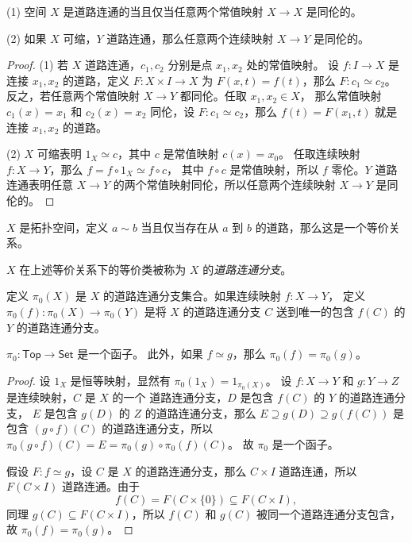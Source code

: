 \documentclass[fontset=none]{Notes}
\newcommand{\cat}[1]{\mathsf{#1}}
\begin{document}
\begin{problem}{}{}
  (1) 空间 $X$ 是道路连通的当且仅当任意两个常值映射
    $X\to X$ 是同伦的。

  (2) 如果 $X$ 可缩，$Y$ 道路连通，那么任意两个连续映射 $X\to Y$
  是同伦的。
\end{problem}
\begin{proof}
  (1) 若 $X$ 道路连通，$c_1,c_2$ 分别是点 $x_1,x_2$ 处的常值映射。
  设 $f:I\to X$ 是连接 $x_1,x_2$ 的道路，定义 $F:X\times I\to X$
  为 $F(x,t)=f(t)$，那么 $F:c_1\simeq c_2$。
  反之，若任意两个常值映射 $X\to Y$ 都同伦。任取 $x_1,x_2\in X$，
  那么常值映射 $c_1(x)=x_1$ 和 $c_2(x)=x_2$ 同伦，设 
  $F:c_1\simeq c_2$，那么 $f(t)=F(x_1,t)$ 就是连接 $x_1,x_2$ 的道路。

  (2) $X$ 可缩表明 $1_X\simeq c$，其中 $c$ 是常值映射 $c(x)=x_0$。
  任取连续映射 $f:X\to Y$，那么 $f=f\circ 1_X\simeq f\circ c$，
  其中 $f\circ c$ 是常值映射，所以 $f$ 零伦。$Y$ 道路连通表明任意
  $X\to Y$ 的两个常值映射同伦，所以任意两个连续映射 $X\to Y$
  是同伦的。
\end{proof}

\begin{theorem}
  $X$ 是拓扑空间，定义 $a\sim b$ 当且仅当存在从 $a$ 到 $b$
  的道路，那么这是一个等价关系。
\end{theorem}

\begin{definition}
  $X$ 在上述等价关系下的等价类被称为 $X$ 的\emph{道路连通分支}。 
\end{definition}

\begin{definition}
  定义 $\pi_0(X)$ 是 $X$ 的道路连通分支集合。如果连续映射 $f:X\to Y$，
  定义 $\pi_0(f):\pi_0(X)\to\pi_0(Y)$ 是将 $X$ 的道路连通分支 $C$
  送到唯一的包含 $f(C)$ 的 $Y$ 的道路连通分支。
\end{definition}

\begin{theorem}
  $\pi_0:\cat{Top}\to \cat{Set}$ 是一个函子。
  此外，如果 $f\simeq g$，那么 $\pi_0(f)=\pi_0(g)$。 
\end{theorem}
\begin{proof}
  设 $1_X$ 是恒等映射，显然有 $\pi_0(1_X)=1_{\pi_0(X)}$。
  设 $f:X\to Y$ 和 $g:Y\to Z$ 是连续映射，$C$ 是 $X$ 的一个
  道路连通分支，$D$ 是包含 $f(C)$ 的 $Y$ 的道路连通分支，
  $E$ 是包含 $g(D)$ 的 $Z$ 的道路连通分支，那么
  $E\supseteq g(D)\supseteq g(f(C))$ 是包含 $(g\circ f)(C)$
  的道路连通分支，所以 $\pi_0(g\circ f)(C)=E=\pi_0(g)\circ \pi_0(f)(C)$。
  故 $\pi_0$ 是一个函子。

  假设 $F:f\simeq g$，设 $C$ 是 $X$ 的道路连通分支，那么 $C\times I$
  道路连通，所以 $F(C\times I)$ 道路连通。由于
  \[
    f(C)=F(C\times\{0\})\subseteq F(C\times I),
  \]
  同理 $g(C)\subseteq F(C\times I)$，所以 $f(C)$ 和 $g(C)$
  被同一个道路连通分支包含，故 $\pi_0(f)=\pi_0(g)$。
\end{proof}
\end{document}
